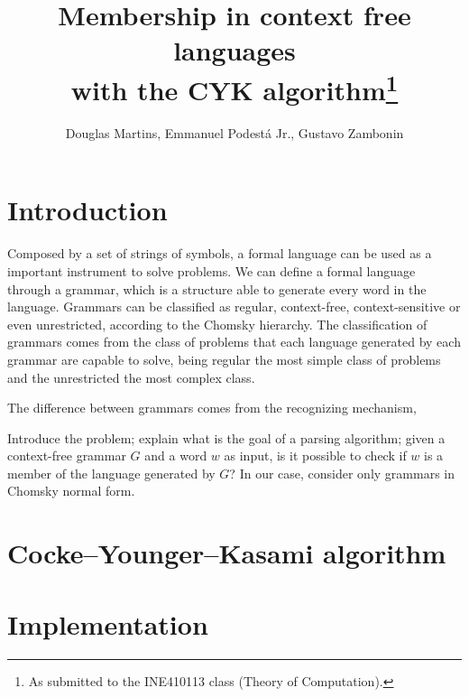 \documentclass[12pt]{article}
\title{Membership in context free languages \\ with the CYK algorithm\footnote{
    As submitted to the INE410113 class (Theory of Computation).}}
\author{Douglas Martins\inst{1}, Emmanuel Podestá Jr.\inst{1}, Gustavo Zambonin\inst{1}}
\begin{document}
 

\maketitle

\section{Introduction}\label{sec:intro}
Composed by a set of strings of symbols, a formal language can be used as a important instrument to solve problems. We can define a formal language through a grammar, which is a structure able to generate every word in the language. Grammars can be classified as regular, context-free, context-sensitive or even unrestricted, according to the Chomsky hierarchy. The classification of grammars comes from the class of problems that each language generated by each grammar are capable to solve, being regular the most simple class of problems and the unrestricted the most complex class.





The difference between grammars comes from the recognizing mechanism, 


Introduce the problem; explain what is the goal of a parsing algorithm; given a context-free grammar $G$ and a word $w$ as input, is it possible to check if $w$ is a member of the language generated by $G$? In our case, consider only grammars in Chomsky normal form.

\section{Cocke–Younger–Kasami algorithm}\label{sec:cyk}

\section{Implementation}\label{sec:imp}




\end{document}
